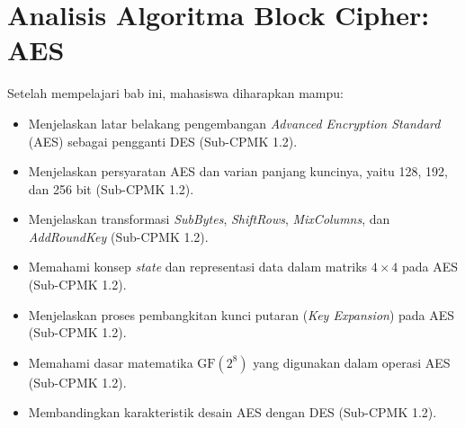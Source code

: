 \documentclass[../../main.tex]{subfiles}
\begin{document}
\chapter{Analisis Algoritma Block Cipher: AES}
\label{chap:aes}

\begin{learningoutcome}
Setelah mempelajari bab ini, mahasiswa diharapkan mampu:
\begin{itemize}
    \item Menjelaskan latar belakang pengembangan \textit{Advanced Encryption Standard} (AES) sebagai pengganti DES (Sub-CPMK 1.2).
    \item Menjelaskan persyaratan AES dan varian panjang kuncinya, yaitu 128, 192, dan 256 bit (Sub-CPMK 1.2).
    \item Menjelaskan transformasi \textit{SubBytes}, \textit{ShiftRows}, \textit{MixColumns}, dan \textit{AddRoundKey} (Sub-CPMK 1.2).
    \item Memahami konsep \textit{state} dan representasi data dalam matriks $4 \times 4$ pada AES (Sub-CPMK 1.2).
    \item Menjelaskan proses pembangkitan kunci putaran (\textit{Key Expansion}) pada AES (Sub-CPMK 1.2).
    \item Memahami dasar matematika $\text{GF}(2^8)$ yang digunakan dalam operasi AES (Sub-CPMK 1.2).
    \item Membandingkan karakteristik desain AES dengan DES (Sub-CPMK 1.2).
\end{itemize}
\end{learningoutcome}










\end{document}
